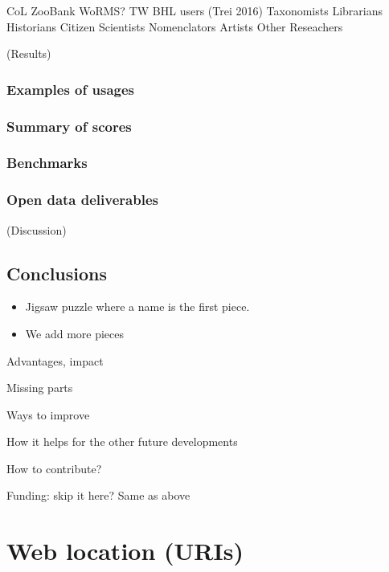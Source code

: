 \documentclass[
]{article}
\providecommand{\tightlist}{%
  \setlength{\itemsep}{0pt}\setlength{\parskip}{0pt}}
\begin{document}
CoL ZooBank WoRMS? TW BHL users (Trei 2016) Taxonomists Librarians
Historians Citizen Scientists Nomenclators Artists Other Reseachers

(Results)

\hypertarget{examples-of-usages}{%
\subsubsection{Examples of usages}\label{examples-of-usages}}

\hypertarget{summary-of-scores}{%
\subsubsection{Summary of scores}\label{summary-of-scores}}

\hypertarget{benchmarks}{%
\subsubsection{Benchmarks}\label{benchmarks}}

\hypertarget{open-data-deliverables}{%
\subsubsection{Open data deliverables}\label{open-data-deliverables}}

(Discussion)

\hypertarget{conclusions}{%
\subsection{Conclusions}\label{conclusions}}

\begin{itemize}
\tightlist
\item
  Jigsaw puzzle where a name is the first piece.
\item
  We add more pieces
\end{itemize}

Advantages, impact

Missing parts

Ways to improve

How it helps for the other future developments

How to contribute?

Funding: skip it here? Same as above

\hypertarget{web-location-uris}{%
\section{Web location (URIs)}\label{web-location-uris}}
\end{document}
